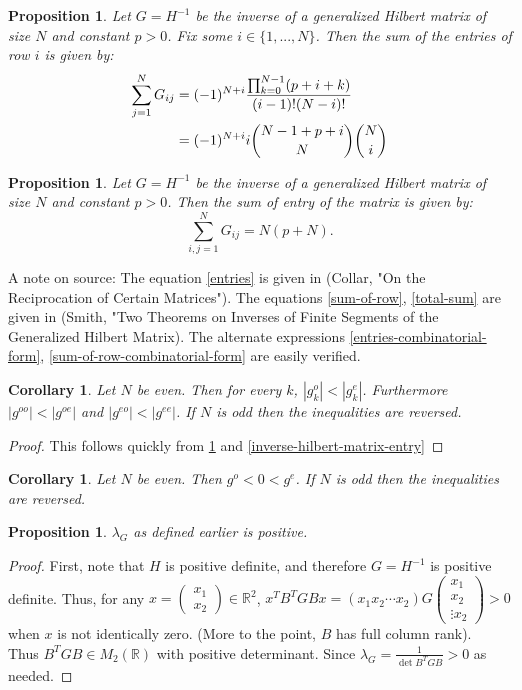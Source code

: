 \documentclass[11pt]{article}
\newtheorem{cor}[thm]{Corollary}
\newtheorem{prop}[thm]{Proposition}
\theoremstyle{definition}
\theoremstyle{remark}
\numberwithin{equation}{section}
\begin{document}
\begin{prop}\label{inverse-hilbert-matrix-row}
Let $G=H^{-1}$ be the inverse of a generalized Hilbert matrix of size $N$ and constant $p>0$. Fix some $i \in \{1,...,N\}$. Then the sum of the entries of row $i$ is given by: 
\begin{align}\label{sum-of-row}
\sum_{j=1}^N G_{ij} &= (-1)^{N+i} \frac{\prod_{k=0}^{N-1} (p+i+k)}{(i-1)! (N-i)!} \\
&= (-1)^{N+i} i \dbinom{N-1+p+i}{N} \dbinom{N}{i} \label{sum-of-row-combinatorial-form}
\end{align}
\end{prop}

\begin{prop}\label{inverse-hilbert-matrix-total} 
Let $G=H^{-1}$ be the inverse of a generalized Hilbert matrix of size $N$ and constant $p>0$. Then the sum of entry of the matrix is given by:
\begin{equation}\label{total-sum}
\sum_{i,j=1}^N G_{ij} = N(p+N).
\end{equation}
\end{prop} 
A note on source: The equation \ref{entries} is given in (Collar, "On the Reciprocation of Certain Matrices"). The equations \ref{sum-of-row}, \ref{total-sum} are given in (Smith, "Two Theorems on Inverses of Finite Segments of the Generalized Hilbert Matrix). The alternate expressions \ref{entries-combinatorial-form}, \ref{sum-of-row-combinatorial-form} are easily verified. 

\begin{cor}
Let $N$ be even. Then for every $k$,  $|g_k^o| < |g_k^e|$. Furthermore $|g^{oo}| < |g^{oe}|$ and $|g^{eo}| < |g^{ee}|$.  If $N$ is odd then the inequalities are reversed. 
\end{cor}
\begin{proof}
This follows quickly from \ref{inverse-hilbert-matrix-row} and \ref{inverse-hilbert-matrix-entry}
\end{proof}

\begin{cor}
Let $N$ be even. Then $g^o < 0 < g^e$. If $N$ is odd then the inequalities are reversed.
\end{cor}

\begin{prop}\label{inverse-determinant-is-positive}
$\lambda_G$ as defined earlier is positive.
\end{prop}
\begin{proof}
First, note that $H$ is positive definite, and therefore $G=H^{-1}$ is positive definite. Thus, for any $x= \begin{pmatrix} x_1 \\ x_2 \end{pmatrix} \in \mathbb{R}^2$, $x^T B^TGBx = (x_1 x_2 \cdots x_2) G \begin{pmatrix} x_1 \\ x_2 \\ \vdots x_2 \end{pmatrix} > 0$ when $x$ is not identically zero. (More to the point, $B$ has full column rank). \\
Thus $B^TGB \in M_2(\mathbb{R})$ with positive determinant. Since $\lambda_G = \frac{1}{\det B^TG B} >0 $ as needed.
\end{proof}
\end{document}
